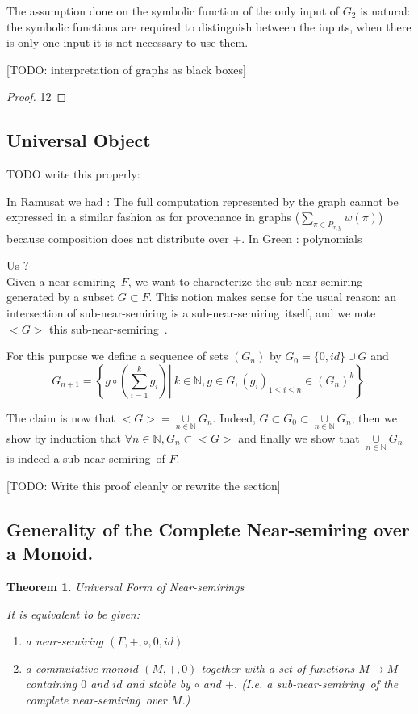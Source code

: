 \documentclass[11pt,a4paper]{article}
\newcommand{\bb}[1]{\mathbb{#1}}
\newcommand{\N}{\bb{N}}
\newcommand{\Ns}{near-semiring}
\newcommand{\sns}{sub-near-semiring}
\newtheorem{theorem}{Theorem}
\theoremstyle{definition}
\renewcommand{\leq}{\leqslant}
\begin{document}
	The assumption done on the symbolic function of the only input of $G_2$ is natural: the symbolic functions are required to distinguish between the inputs, when there is only one input it is not necessary to use them.
	
	[TODO: interpretation of graphs as black boxes]
	
\begin{proof}
12
\end{proof}


\subsection{Universal Object}

TODO write this properly:

In Ramusat we had :
	The full computation represented by the graph cannot be expressed in a similar fashion as for provenance in graphs ($\underset{\pi \in P_{x,y}}{\sum} w(\pi)$) because composition does not distribute over $+$.
In Green : polynomials

Us ?
\\


Given a \Ns\ $F$, we want to characterize the sub-near-semiring generated by a subset $G \subset F$. This notion makes sense for the usual reason: an intersection of sub-near-semiring is a \sns\ itself, and we note $<G>$ this \sns\ .

For this purpose we define a sequence of sets $(G_n)$ by $G_0=\{0,id\} \cup G$ and 
$$G_{n+1} = \left\{ \left. g \circ \left( \overset{k}{\underset{i=1}{\sum}} g_i \right) \right| \ k \in \N, g \in G, (g_i)_{1 \leq i \leq n} \in (G_n)^k \right\} .$$

	The claim is now that $<G> = \underset{n \in \N}{\cup} G_n$. Indeed, $G \subset G_0 \subset \underset{n \in \N}{\cup} G_n$, then we show by induction that $\forall n \in \N, G_n \subset <G>$ and finally we show that $\underset{n \in \N}{\cup} G_n$ is indeed a \sns\ of $F$.
	
	[TODO: Write this proof cleanly or rewrite the section]

\subsection{Generality of the Complete Near-semiring over a Monoid.}

\begin{theorem}{Universal Form of Near-semirings}
\label{thm:near_semirings_fun_monoids}

	It is equivalent to be given:

	\begin{enumerate}

		\item a near-semiring $(F,+,\circ,0,id)$

		\item a commutative monoid $(M,+,0)$ together with a set of functions $M \to M$ containing $0$ and $id$ and stable by $\circ$ and $+$. (I.e. a \sns\ of the complete \Ns\ over $M$.)

	\end{enumerate}

\end{theorem}
\end{document}
